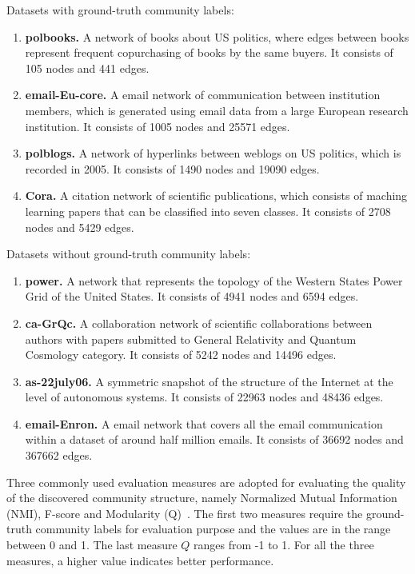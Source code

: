 \documentclass[sigconf]{acmart}
\begin{document}
Datasets with ground-truth community labels:
\begin{enumerate}[{1)}]
\item
\textbf{polbooks\footnotemark[1].} A network of books about US politics, where edges between books represent frequent copurchasing of books by the same buyers. It consists of 105 nodes and 441 edges.
\item
\textbf{email-Eu-core\footnotemark[2].} A email network of communication between institution members, which is generated using email data from a large European research institution. It consists of 1005 nodes and 25571 edges.
\item
\textbf{polblogs\footnotemark[1].} A network of hyperlinks between weblogs on US politics, which is recorded in 2005. It consists of 1490 nodes and 19090 edges.
\item
\textbf{Cora\footnotemark[3].} A citation network of scientific publications, which consists of maching learning papers that can be classified into seven classes. It consists of 2708 nodes and 5429 edges.
\end{enumerate}

Datasets without ground-truth community labels:
\begin{enumerate}[{1)}]
\item
\textbf{power\footnotemark[4].} A network that represents the topology of the Western States Power Grid of the United States. It consists of 4941 nodes and 6594 edges.
\item
\textbf{ca-GrQc\footnotemark[2].} A collaboration network of scientific collaborations between authors with papers submitted to General Relativity and Quantum Cosmology category. It consists of 5242 nodes and 14496 edges.
\item
\textbf{as-22july06\footnotemark[4].} A symmetric snapshot of the structure of the Internet at the level of autonomous systems. It consists of 22963 nodes and 48436 edges.
\item
\textbf{email-Enron\footnotemark[4].} A email network that covers all the email communication within a dataset of around half million emails. It consists of 36692 nodes and 367662 edges.
\end{enumerate}


Three commonly used evaluation measures are adopted for evaluating the quality of the discovered community structure, namely Normalized Mutual Information (NMI), F-score and Modularity (Q)~\cite{chakraborty2014permanence}. The first two measures require the ground-truth community labels for evaluation purpose and the values are in the range between 0 and 1. The last measure $Q$ ranges from -1 to 1. For all the three measures, a higher value indicates better performance.
\end{document}
